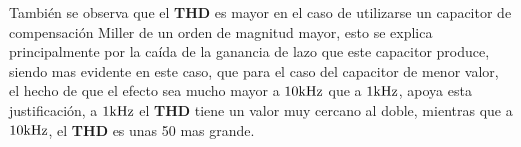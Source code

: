 También se observa que el \textbf{THD} es mayor en el caso de utilizarse un capacitor de compensación Miller de un orden de magnitud mayor, esto se explica principalmente por la caída de la ganancia de lazo que este capacitor produce, siendo mas evidente en este caso, que para el caso del capacitor de menor valor, el hecho de que el efecto sea mucho mayor a $10 \si[per-mode=symbol]{\kilo\hertz}$ que a $1 \si[per-mode=symbol]{\kilo\hertz}$, apoya esta justificación, a $1 \si[per-mode=symbol]{\kilo\hertz}$ el \textbf{THD} tiene un valor muy cercano al doble, mientras que a $10 \si[per-mode=symbol]{\kilo\hertz}$, el \textbf{THD} es unas \num{50} mas grande.








